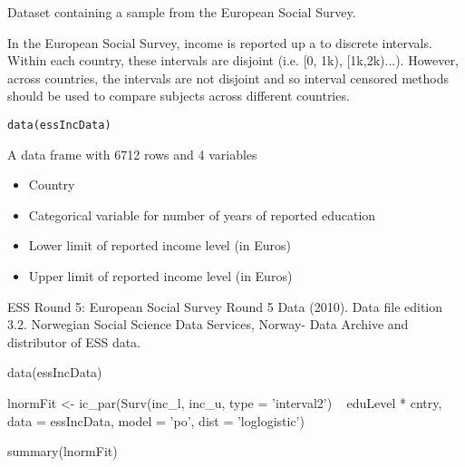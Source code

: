 \documentclass[a4paper]{book}
\begin{document}
%
\begin{Description}\relax
 
Dataset containing a sample from the European Social Survey.

In the European Social Survey, income is reported up a to discrete intervals. Within each country, these intervals are disjoint (i.e. [0, 1k), [1k,2k)...). However, across countries, the intervals are not disjoint and so interval censored methods should be used to compare subjects across different countries.

\end{Description}
%
\begin{Usage}
\begin{verbatim}
data(essIncData)
\end{verbatim}
\end{Usage}
%
\begin{Format}
A data frame with 6712 rows and 4 variables	
\begin{itemize}

\item {}   Country
\item {}   Categorical variable for number of years of reported education
\item {}   Lower limit of reported income level (in Euros)
\item {}   Upper limit of reported income level (in Euros)

\end{itemize}

\end{Format}
%
\begin{Source}\relax
ESS Round 5: European Social Survey Round 5 Data (2010). Data file edition 3.2. Norwegian Social Science Data Services, Norway\bsl{}- Data Archive and distributor of ESS data.
\end{Source}
%
\begin{Examples}
\begin{ExampleCode}
	data(essIncData)
	
	lnormFit <- ic_par(Surv(inc_l, inc_u, type = 'interval2') ~ eduLevel * cntry, 	
	                   data = essIncData,
	                   model = 'po',
	                   dist = 'loglogistic')
	
	summary(lnormFit)
\end{ExampleCode}
\end{Examples}
\end{document}
